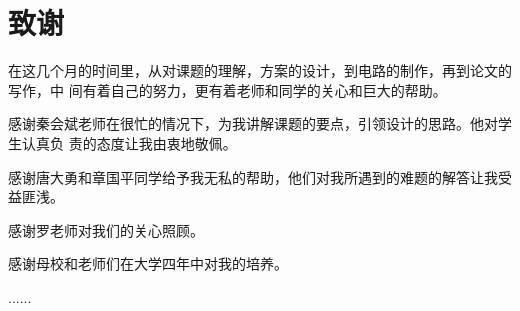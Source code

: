 \chapter*{致谢}

在这几个月的时间里，从对课题的理解，方案的设计，到电路的制作，再到论文的写作，中
间有着自己的努力，更有着老师和同学的关心和巨大的帮助。

感谢秦会斌老师在很忙的情况下，为我讲解课题的要点，引领设计的思路。他对学生认真负
责的态度让我由衷地敬佩。

感谢唐大勇和章国平同学给予我无私的帮助，他们对我所遇到的难题的解答让我受益匪浅。

感谢罗老师对我们的关心照顾。

感谢母校和老师们在大学四年中对我的培养。

......